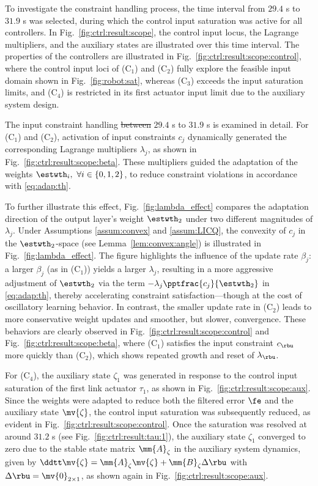 \documentclass[letterpaper, journal]{IEEEtran}
\providecommand{\DIFadd}[1]{{\protect\color{blue}\uwave{#1}}} %
\providecommand{\DIFdel}[1]{{\protect\color{red}\sout{#1}}} %
\providecommand{\DIFaddbegin}{} %
\providecommand{\DIFaddend}{} %
\providecommand{\DIFdelbegin}{} %
\providecommand{\DIFdelend}{} %
\begin{document}
To investigate the constraint handling process, the time interval from $29.4$ s to $31.9$ s was selected, during which the control input saturation was active for all controllers.
In Fig.~\ref{fig:ctrl:result:scope}, the control input locus, the Lagrange multipliers, and the auxiliary states are illustrated over this time interval.
The properties of the controllers are illustrated in Fig.~\ref{fig:ctrl:result:scope:control}, where the control input loci of (C$_1$) and (C$_2$) fully explore the feasible input domain shown in Fig.~\ref{fig:robot:sat}, whereas (C$_3$) exceeds the input saturation limits, and (C$_4$) is restricted in its first actuator input limit due to the auxiliary system design.

The input constraint handling \DIFdelbegin \DIFdel{between }\DIFdelend \DIFaddbegin \DIFadd{from }\DIFaddend $29.4$ s to $31.9$ s is examined in detail. 
For (C$_1$) and (C$_2$), activation of input constraints $c_j$ dynamically generated the corresponding Lagrange multipliers $\lambda_j$, as shown in Fig.~\ref{fig:ctrl:result:scope:beta}. 
These multipliers guided the adaptation of the weights $\estwth_i,\ \forall i\in\{0,1,2\}$, to reduce constraint violations in accordance with \eqref{eq:adap:th}.

To further illustrate this effect, Fig.~\ref{fig:lambda_effect} compares the adaptation direction of the output layer's weight $\estwth_2$ under two different magnitudes of $\lambda_j$. 
Under Assumptions \ref{assum:convex} and \ref{assum:LICQ}, the convexity of $c_j$ in the $\estwth_2$-space (see Lemma~\ref{lem:convex:angle}) is illustrated in Fig.~\ref{fig:lambda_effect}.
The figure highlights the influence of the update rate $\beta_j$: a larger $\beta_j$ (as in (C$_1$)) yields a larger $\lambda_j$, resulting in a more aggressive adjustment of $\estwth_2$ via the term $-\lambda_j\pptfrac{c_j}{\estwth_2}$ in \eqref{eq:adap:th}, thereby accelerating constraint satisfaction—though at the cost of oscillatory learning behavior. 
In contrast, the smaller update rate in (C$_2$) leads to more conservative weight updates and smoother, but slower, convergence.
These behaviors are clearly observed in Fig.~\ref{fig:ctrl:result:scope:control} and Fig.~\ref{fig:ctrl:result:scope:beta}, where (C$_1$) satisfies the input constraint $c_{\rbu}$ more quickly than (C$_2$), which shows repeated growth and reset of $\lambda_{\rbu}$. 

For (C$_4$), the auxiliary state $\zeta_1$ was generated in response to the control input saturation of the first link actuator $\tau_1$, as shown in Fig.~\ref{fig:ctrl:result:scope:aux}.
Since the weights were adapted to reduce both the filtered error $\fe$ and the auxiliary state $\mv{\zeta}$, the control input saturation was subsequently reduced, as evident in Fig.~\ref{fig:ctrl:result:scope:control}.
Once the saturation was resolved at around $31.2$ s (see Fig.~\ref{fig:ctrl:result:tau:1}), the auxiliary state $\zeta_1$ converged to zero due to the stable state matrix $\mm{A}_\zeta$ in the auxiliary system dynamics, given by $\ddtt\mv{\zeta} = \mm{A}_\zeta \mv{\zeta} + \mm{B}_\zeta \Delta\rbu$ with $\Delta\rbu=\mv{0}_{2\times1}$, as shown again in Fig.~\ref{fig:ctrl:result:scope:aux}.
\end{document}
